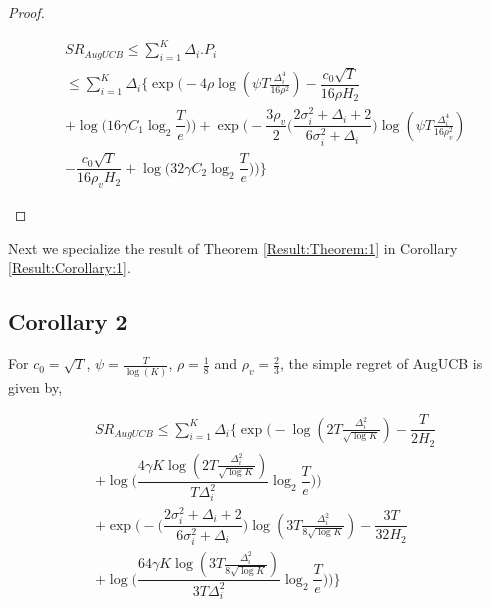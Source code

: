 \begin{proof}
\begin{small}
\begin{align*}
& SR_{AugUCB} \leq \sum_{i=1}^{K} \Delta_{i}. P_{i}\\
& \leq \sum_{i=1}^{K} \Delta_{i}\bigg\lbrace \exp\bigg(-4\rho\log (\psi T\frac{\Delta_{i}^{4}}{16\rho^{2}})-\dfrac{c_{0}\sqrt{T}}{16\rho H_{2}}\\
& + \log \big( 16\gamma C_1\log_{2}\dfrac{T}{e} \big) \bigg) + \exp\bigg(- \dfrac{3\rho_v}{2} \bigg(\dfrac{2\sigma_{i}^{2}+\Delta_{i}+2}{6\sigma_{i}^{2}+\Delta_{i}}\bigg)\log(\psi T\frac{\Delta_{i}^{4}}{16\rho_{v}^{2}})\\
& -\dfrac{c_{0}\sqrt{T}}{16\rho_v H_{2}} + \log\big ( 32\gamma C_2\log_{2}\dfrac{T}{e} \big)  \bigg)\bigg\rbrace
\end{align*}
\end{small}

\end{proof}

	Next we specialize the result of Theorem \ref{Result:Theorem:1} in Corollary \ref{Result:Corollary:1}.

\subsection{Corollary 2}


\begin{corollary}
\label{Result:Corollary:1}
For $c_{0}=\sqrt{T}$, $\psi=\frac{T}{\log (K)}$, $\rho=\frac{1}{8}$ and $\rho_v=\frac{2}{3}$, the simple regret of AugUCB is given by,
\begin{small}
\begin{align*}
& SR_{AugUCB} \leq \sum_{i=1}^{K} \Delta_{i}\bigg\lbrace\exp\bigg(-\log ( 2T\frac{\Delta_{i}^{2}}{\sqrt{\log K}})-\dfrac{T}{2 H_{2}}\\
& + \log \big( \dfrac{4\gamma K\log ( 2T \frac{\Delta_{i}^{2}}{\sqrt{\log K}})}{T\Delta_{i}^{2}}\log_{2}\dfrac{T}{e} \big) \bigg)\\
& +  \exp\bigg(- \bigg(\dfrac{2\sigma_{i}^{2}+\Delta_{i}+2}{6\sigma_{i}^{2}+\Delta_{i}}\bigg)\log( 3T\frac{\Delta_{i}^{2}}{8\sqrt{\log K}}) -\dfrac{3T}{32 H_{2}}\\
& + \log\big ( \dfrac{64\gamma K\log ( 3T \frac{\Delta_{i}^{2}}{8\sqrt{\log K}})}{3T\Delta_{i}^{2}}\log_{2}\dfrac{T}{e} \big)  \bigg)\bigg\rbrace
\end{align*}
\end{small}
\end{corollary}

